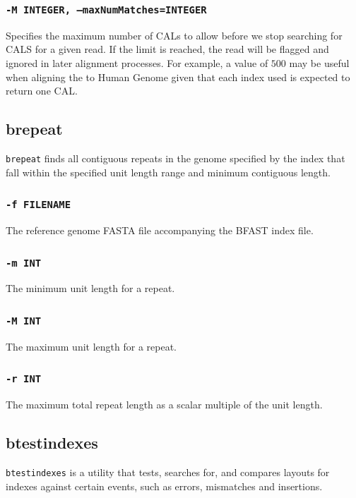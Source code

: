 \documentclass[a4paper,12pt]{book}
\newcommand{\TT}[1]{{\tt #1}} %
\newcommand{\rGFF}{reference genome FASTA file}
\newcommand{\BIF}{BFAST index file} %
\begin{document}
\subsubsection{\TT{-M INTEGER, --maxNumMatches=INTEGER}}
Specifies the maximum number of CALs to allow before we stop searching for CALS for a given read.
If the limit is reached, the read will be flagged and ignored in later alignment processes.
For example, a value of $500$ may be useful when aligning the to Human Genome given that each index used is expected to return one CAL.

\subsection{brepeat}
\label{sec:brepeat}
\TT{brepeat} finds all contiguous repeats in the genome specified by the index that fall within the specified unit length range and minimum contiguous length.

\subsubsection{\TT{-f FILENAME}}
The \rGFF{} accompanying the \BIF{}.

\subsubsection{\TT{-m INT}}
The minimum unit length for a repeat.

\subsubsection{\TT{-M INT}}
The maximum unit length for a repeat.

\subsubsection{\TT{-r INT}}
The maximum total repeat length as a scalar multiple of the unit length.

\subsection{btestindexes}
\label{sec:btestindexes}
\TT{btestindexes} is a utility that tests, searches for, and compares layouts for indexes against certain events, such as errors, mismatches and insertions.
\end{document}
